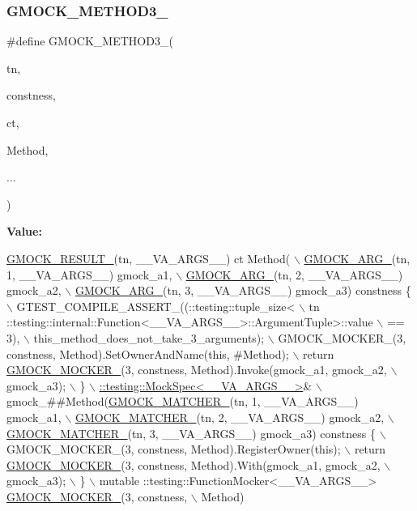 \subsubsection{\texorpdfstring{G\+M\+O\+C\+K\+\_\+\+M\+E\+T\+H\+O\+D3\+\_\+}{GMOCK\_METHOD3\_}}
{\footnotesize\ttfamily \#define G\+M\+O\+C\+K\+\_\+\+M\+E\+T\+H\+O\+D3\+\_\+(\begin{DoxyParamCaption}\item[{}]{tn,  }\item[{}]{constness,  }\item[{}]{ct,  }\item[{}]{Method,  }\item[{}]{... }\end{DoxyParamCaption})}

{\bfseries Value\+:}
\begin{DoxyCode}
\hyperlink{gmock-generated-function-mockers_8h_a0e9d94e9c77df84f1103af06feee1077}{GMOCK\_RESULT\_}(tn, \_\_VA\_ARGS\_\_) ct Method( \(\backslash\)
      \hyperlink{gmock-generated-function-mockers_8h_a887575cc1c31158fba808180a10c004f}{GMOCK\_ARG\_}(tn, 1, \_\_VA\_ARGS\_\_) gmock\_a1, \(\backslash\)
      \hyperlink{gmock-generated-function-mockers_8h_a887575cc1c31158fba808180a10c004f}{GMOCK\_ARG\_}(tn, 2, \_\_VA\_ARGS\_\_) gmock\_a2, \(\backslash\)
      \hyperlink{gmock-generated-function-mockers_8h_a887575cc1c31158fba808180a10c004f}{GMOCK\_ARG\_}(tn, 3, \_\_VA\_ARGS\_\_) gmock\_a3) constness \{ \(\backslash\)
    GTEST\_COMPILE\_ASSERT\_((::testing::tuple\_size<                          \(\backslash\)
        tn ::testing::internal::Function<\_\_VA\_ARGS\_\_>::ArgumentTuple>::value \(\backslash\)
            == 3), \(\backslash\)
        this\_method\_does\_not\_take\_3\_arguments); \(\backslash\)
    GMOCK\_MOCKER\_(3, constness, Method).SetOwnerAndName(\textcolor{keyword}{this}, #Method); \(\backslash\)
    return \hyperlink{gmock-generated-function-mockers_8h_a7d362499e27b1bc3a9806dd3cf58a5b7}{GMOCK\_MOCKER\_}(3, constness, Method).Invoke(gmock\_a1, gmock\_a2, \(\backslash\)
        gmock\_a3); \(\backslash\)
  \} \(\backslash\)
  \hyperlink{classtesting_1_1internal_1_1MockSpec}{::testing::MockSpec<\_\_VA\_ARGS\_\_>}& \(\backslash\)
      gmock\_##Method(\hyperlink{gmock-generated-function-mockers_8h_aa87d0009fe91f1c89d658776b55a769c}{GMOCK\_MATCHER\_}(tn, 1, \_\_VA\_ARGS\_\_) gmock\_a1, \(\backslash\)
                     \hyperlink{gmock-generated-function-mockers_8h_aa87d0009fe91f1c89d658776b55a769c}{GMOCK\_MATCHER\_}(tn, 2, \_\_VA\_ARGS\_\_) gmock\_a2, \(\backslash\)
                     \hyperlink{gmock-generated-function-mockers_8h_aa87d0009fe91f1c89d658776b55a769c}{GMOCK\_MATCHER\_}(tn, 3, \_\_VA\_ARGS\_\_) gmock\_a3) constness \{ \(\backslash\)
    GMOCK\_MOCKER\_(3, constness, Method).RegisterOwner(\textcolor{keyword}{this}); \(\backslash\)
    return \hyperlink{gmock-generated-function-mockers_8h_a7d362499e27b1bc3a9806dd3cf58a5b7}{GMOCK\_MOCKER\_}(3, constness, Method).With(gmock\_a1, gmock\_a2, \(\backslash\)
        gmock\_a3); \(\backslash\)
  \} \(\backslash\)
  mutable ::testing::FunctionMocker<\_\_VA\_ARGS\_\_> \hyperlink{gmock-generated-function-mockers_8h_a7d362499e27b1bc3a9806dd3cf58a5b7}{GMOCK\_MOCKER\_}(3, constness, \(\backslash\)
      Method)
\end{DoxyCode}


